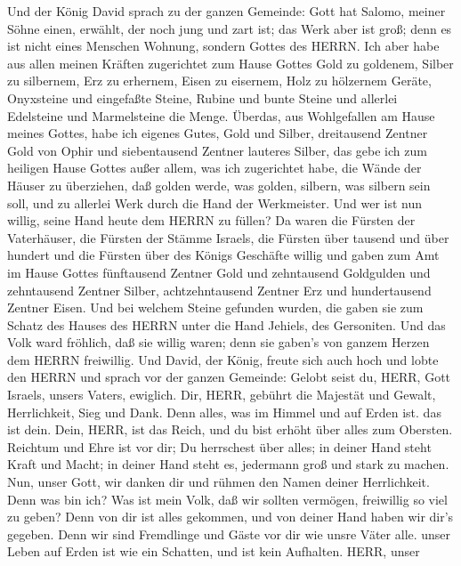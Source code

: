  Und der König David sprach zu der ganzen Gemeinde: Gott hat
Salomo, meiner Söhne einen, erwählt, der noch jung und zart ist; das
Werk aber ist groß; denn es ist nicht eines Menschen Wohnung, sondern
Gottes des HERRN.  Ich aber habe aus allen meinen Kräften
zugerichtet zum Hause Gottes Gold zu goldenem, Silber zu silbernem, Erz
zu erhernem, Eisen zu eisernem, Holz zu hölzernem Geräte, Onyxsteine und
eingefaßte Steine, Rubine und bunte Steine und allerlei Edelsteine und
Marmelsteine die Menge.  Überdas, aus Wohlgefallen am Hause
meines Gottes, habe ich eigenes Gutes, Gold und Silber, 
dreitausend Zentner Gold von Ophir und siebentausend Zentner lauteres
Silber, das gebe ich zum heiligen Hause Gottes außer allem, was ich
zugerichtet habe, die Wände der Häuser zu überziehen,  daß
golden werde, was golden, silbern, was silbern sein soll, und zu
allerlei Werk durch die Hand der Werkmeister. Und wer ist nun willig,
seine Hand heute dem HERRN zu füllen?  Da waren die Fürsten
der Vaterhäuser, die Fürsten der Stämme Israels, die Fürsten über
tausend und über hundert und die Fürsten über des Königs Geschäfte
willig  und gaben zum Amt im Hause Gottes fünftausend
Zentner Gold und zehntausend Goldgulden und zehntausend Zentner Silber,
achtzehntausend Zentner Erz und hundertausend Zentner Eisen.
 Und bei welchem Steine gefunden wurden, die gaben sie zum
Schatz des Hauses des HERRN unter die Hand Jehiels, des Gersoniten.
 Und das Volk ward fröhlich, daß sie willig waren; denn sie
gaben's von ganzem Herzen dem HERRN freiwillig. Und David, der König,
freute sich auch hoch  und lobte den HERRN und sprach vor
der ganzen Gemeinde: Gelobt seist du, HERR, Gott Israels, unsers Vaters,
ewiglich.  Dir, HERR, gebührt die Majestät und Gewalt,
Herrlichkeit, Sieg und Dank. Denn alles, was im Himmel und auf Erden
ist. das ist dein. Dein, HERR, ist das Reich, und du bist erhöht über
alles zum Obersten.  Reichtum und Ehre ist vor dir; Du
herrschest über alles; in deiner Hand steht Kraft und Macht; in deiner
Hand steht es, jedermann groß und stark zu machen.  Nun,
unser Gott, wir danken dir und rühmen den Namen deiner Herrlichkeit.
 Denn was bin ich? Was ist mein Volk, daß wir sollten
vermögen, freiwillig so viel zu geben? Denn von dir ist alles gekommen,
und von deiner Hand haben wir dir's gegeben.  Denn wir sind
Fremdlinge und Gäste vor dir wie unsre Väter alle. unser Leben auf Erden
ist wie ein Schatten, und ist kein Aufhalten.  HERR, unser
